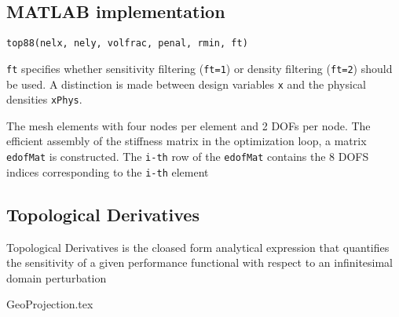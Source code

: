 \documentclass{article}
\newcommand{\code}[1]{\colorbox{light-gray}{\texttt{#1}}}
\begin{document}
\subsection*{MATLAB implementation}
\code{top88(nelx, nely, volfrac, penal, rmin, ft)}

\code{ft} specifies whether sensitivity filtering (\code{ft=1}) or density filtering (\code{ft=2}) should be used. A distinction is made between design variables \code {x} and the physical densities \code{xPhys}.

The mesh elements with four nodes per element and 2 DOFs per node. The efficient assembly of the stiffness matrix in the optimization loop, a matrix \code{edofMat} is constructed. The \code{i-th} row of the \code{edofMat} contains the 8 DOFS indices corresponding to the \code{i-th} element
\subsection*{Topological Derivatives}
Topological Derivatives is the cloased form analytical expression that quantifies the sensitivity of a given performance functional with respect to an infinitesimal domain perturbation

{GeoProjection.tex}
\end{document}
